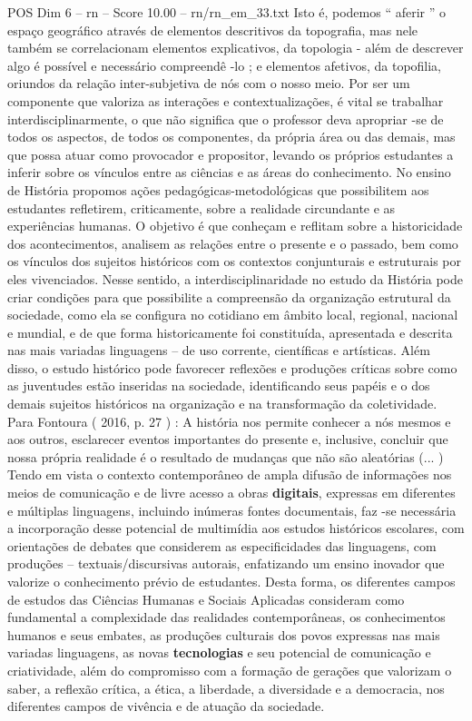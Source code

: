 \begin{textsample}{POS Dim 6 – rn – Score 10.00 – rn/rn\_em\_33.txt}
Isto é, podemos “ aferir ” o espaço geográfico através de elementos descritivos da topografia, mas nele também se correlacionam elementos explicativos, da topologia - além de descrever algo é possível e necessário compreendê -lo ; e elementos afetivos, da topofilia, oriundos da relação inter-subjetiva de nós com o nosso meio.
Por ser um componente que valoriza as interações e contextualizações, é vital se trabalhar interdisciplinarmente, o que não significa que o professor deva apropriar -se de todos os aspectos, de todos os componentes, da própria área ou das demais, mas que possa atuar como provocador e propositor, levando os próprios estudantes a inferir sobre os vínculos entre as ciências e as áreas do conhecimento.
No ensino de História propomos ações pedagógicas-metodológicas que possibilitem aos estudantes refletirem, criticamente, sobre a realidade circundante e as experiências humanas.
O objetivo é que conheçam e reflitam sobre a historicidade dos acontecimentos, analisem as relações entre o presente e o passado, bem como os vínculos dos sujeitos históricos com os contextos conjunturais e estruturais por eles vivenciados.
Nesse sentido, a interdisciplinaridade no estudo da História pode criar condições para que possibilite a compreensão da organização estrutural da sociedade, como ela se configura no cotidiano em âmbito local, regional, nacional e mundial, e de que forma historicamente foi constituída, apresentada e descrita nas mais variadas linguagens – de uso corrente, científicas e artísticas.
Além disso, o estudo histórico pode favorecer reflexões e produções críticas sobre como as juventudes estão inseridas na sociedade, identificando seus papéis e o dos demais sujeitos históricos na organização e na transformação da coletividade.
Para Fontoura ( 2016, p. 27 ) : A história nos permite conhecer a nós mesmos e aos outros, esclarecer eventos importantes do presente e, inclusive, concluir que nossa própria realidade é o resultado de mudanças que não são aleatórias (... ) Tendo em vista o contexto contemporâneo de ampla difusão de informações nos meios de comunicação e de livre acesso a obras \textbf{digitais}, expressas em diferentes e múltiplas linguagens, incluindo inúmeras fontes documentais, faz -se necessária a incorporação desse potencial de multimídia aos estudos históricos escolares, com orientações de debates que considerem as especificidades das linguagens, com produções – textuais/discursivas autorais, enfatizando um ensino inovador que valorize o conhecimento prévio de estudantes.
Desta forma, os diferentes campos de estudos das Ciências Humanas e Sociais Aplicadas consideram como fundamental a complexidade das realidades contemporâneas, os conhecimentos humanos e seus embates, as produções culturais dos povos expressas nas mais variadas linguagens, as novas \textbf{tecnologias} e seu potencial de comunicação e criatividade, além do compromisso com a formação de gerações que valorizam o saber, a reflexão crítica, a ética, a liberdade, a diversidade e a democracia, nos diferentes campos de vivência e de atuação da sociedade.

\end{textsample}
